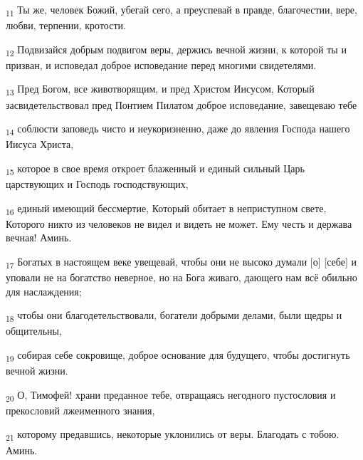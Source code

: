 \begin{tcolorbox}
\textsubscript{11} Ты же, человек Божий, убегай сего, а преуспевай в правде, благочестии, вере, любви, терпении, кротости.
\end{tcolorbox}
\begin{tcolorbox}
\textsubscript{12} Подвизайся добрым подвигом веры, держись вечной жизни, к которой ты и призван, и исповедал доброе исповедание перед многими свидетелями.
\end{tcolorbox}
\begin{tcolorbox}
\textsubscript{13} Пред Богом, все животворящим, и пред Христом Иисусом, Который засвидетельствовал пред Понтием Пилатом доброе исповедание, завещеваю тебе
\end{tcolorbox}
\begin{tcolorbox}
\textsubscript{14} соблюсти заповедь чисто и неукоризненно, даже до явления Господа нашего Иисуса Христа,
\end{tcolorbox}
\begin{tcolorbox}
\textsubscript{15} которое в свое время откроет блаженный и единый сильный Царь царствующих и Господь господствующих,
\end{tcolorbox}
\begin{tcolorbox}
\textsubscript{16} единый имеющий бессмертие, Который обитает в неприступном свете, Которого никто из человеков не видел и видеть не может. Ему честь и держава вечная! Аминь.
\end{tcolorbox}
\begin{tcolorbox}
\textsubscript{17} Богатых в настоящем веке увещевай, чтобы они не высоко думали [о] [себе] и уповали не на богатство неверное, но на Бога живаго, дающего нам всё обильно для наслаждения;
\end{tcolorbox}
\begin{tcolorbox}
\textsubscript{18} чтобы они благодетельствовали, богатели добрыми делами, были щедры и общительны,
\end{tcolorbox}
\begin{tcolorbox}
\textsubscript{19} собирая себе сокровище, доброе основание для будущего, чтобы достигнуть вечной жизни.
\end{tcolorbox}
\begin{tcolorbox}
\textsubscript{20} О, Тимофей! храни преданное тебе, отвращаясь негодного пустословия и прекословий лжеименного знания,
\end{tcolorbox}
\begin{tcolorbox}
\textsubscript{21} которому предавшись, некоторые уклонились от веры. Благодать с тобою. Аминь.
\end{tcolorbox}
